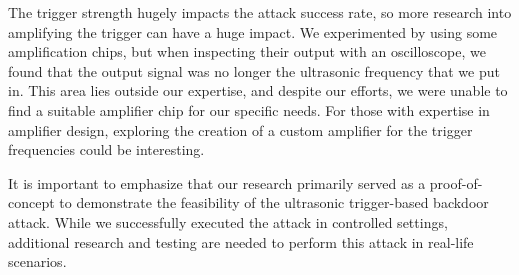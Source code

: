 \documentclass{report}
\theoremstyle{definition}
\theoremstyle{remark}
\begin{document}
The trigger strength hugely impacts the attack success rate, so more research into amplifying the trigger can have a huge impact. We experimented by using some amplification chips, but when inspecting their output with an oscilloscope, we found that the output signal was no longer the ultrasonic frequency that we put in. This area lies outside our expertise, and despite our efforts, we were unable to find a suitable amplifier chip for our specific needs. For those with expertise in amplifier design, exploring the creation of a custom amplifier for the trigger frequencies could be interesting.

It is important to emphasize that our research primarily served as a proof-of-concept to demonstrate the feasibility of the ultrasonic trigger-based backdoor attack. While we successfully executed the attack in controlled settings, additional research and testing are needed to perform this attack in real-life scenarios.

\newpage


\end{document}
